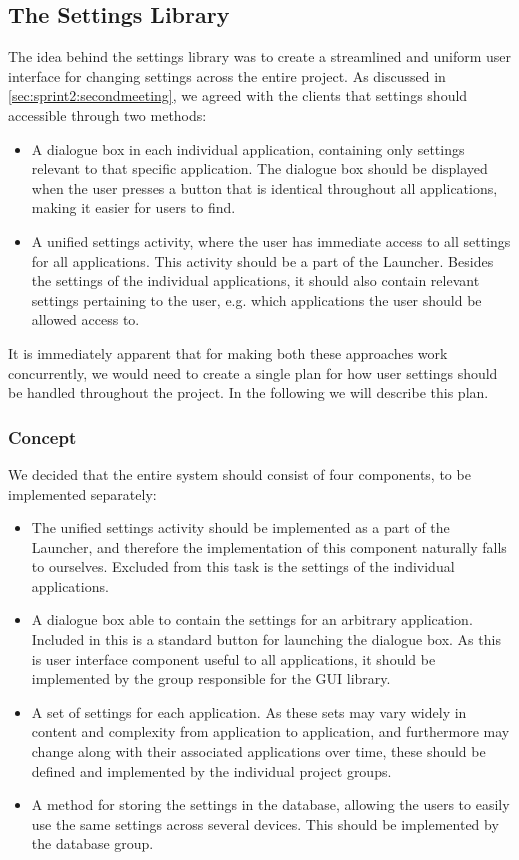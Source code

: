 \subsection{The Settings Library}
The idea behind the settings library was to create a streamlined and uniform user interface for changing settings across the entire \giraf project. As discussed in \cref{sec:sprint2:secondmeeting}, we agreed with the clients that settings should accessible through two methods:
\begin{itemize}
	\item A dialogue box in each individual application, containing only settings relevant to that specific application. The dialogue box should be displayed when the user presses a button that is identical throughout all \giraf applications, making it easier for users to find.
	\item A unified settings activity, where the user has immediate access to all settings for all \giraf applications. This activity should be a part of the Launcher. Besides the settings of the individual applications, it should also contain relevant settings pertaining to the user, e.g. which applications the user should be allowed access to.
\end{itemize}

It is immediately apparent that for making both these approaches work concurrently, we would need to create a single plan for how user settings should be handled throughout the \giraf project. In the following we will describe this plan.

\subsubsection{Concept}
We decided that the entire system should consist of four components, to be implemented separately:
\begin{itemize}
	\item The unified settings activity should be implemented as a part of the Launcher, and therefore the implementation of this component naturally falls to ourselves. Excluded from this task is the settings of the individual applications.
	\item A dialogue box able to contain the settings for an arbitrary \giraf application. Included in this is a standard button for launching the dialogue box. As this is user interface component useful to all applications, it should be implemented by the group responsible for the \giraf GUI library.
	\item A set of settings for each \giraf application. As these sets may vary widely in content and complexity from application to application, and furthermore may change along with their associated applications over time, these should be defined and implemented by the individual project groups. 
	\item A method for storing the settings in the database, allowing the users to easily use the same settings across several devices. This should be implemented by the database group. 
\end{itemize}

